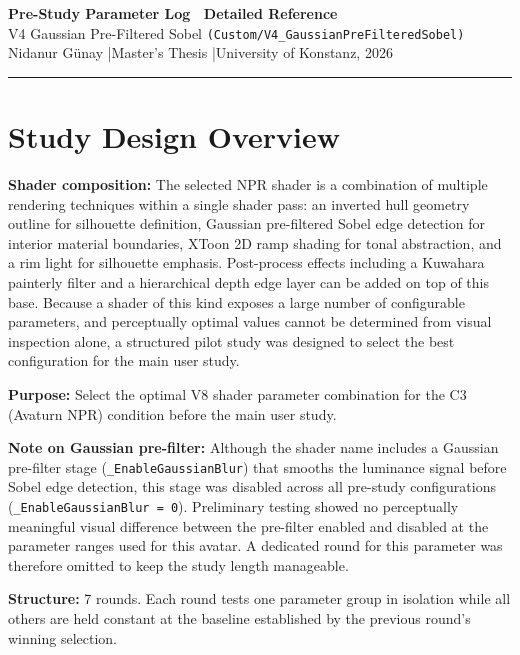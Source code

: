 \documentclass[11pt,a4paper]{article}
\newcommand{\prop}[1]{\texttt{#1}}
\begin{document}
\begin{center}
  {\Large\bfseries\color{uniblue} Pre-Study Parameter Log \textemdash\ Detailed Reference}\\[4pt]
  {\large V4 Gaussian Pre-Filtered Sobel \texttt{(Custom/V4\_GaussianPreFilteredSobel)}}\\[8pt]
  {\normalsize Nidanur G\"{u}nay \quad|\quad Master's Thesis \quad|\quad University of Konstanz, 2026}
\end{center}

\medskip
\noindent\rule{\linewidth}{0.4pt}
\medskip

\section*{Study Design Overview}

\textbf{Shader composition:} The selected NPR shader is a combination of multiple rendering techniques within a single shader pass: an inverted hull geometry outline for silhouette definition, Gaussian pre-filtered Sobel edge detection for interior material boundaries, XToon 2D ramp shading for tonal abstraction, and a rim light for silhouette emphasis. Post-process effects including a Kuwahara painterly filter and a hierarchical depth edge layer can be added on top of this base. Because a shader of this kind exposes a large number of configurable parameters, and perceptually optimal values cannot be determined from visual inspection alone, a structured pilot study was designed to select the best configuration for the main user study.

\medskip
\textbf{Purpose:} Select the optimal V8 shader parameter combination for the C3 (Avaturn NPR) condition before the main user study.

\textbf{Note on Gaussian pre-filter:} Although the shader name includes a Gaussian pre-filter stage (\prop{\_EnableGaussianBlur}) that smooths the luminance signal before Sobel edge detection, this stage was disabled across all pre-study configurations (\prop{\_EnableGaussianBlur = 0}). Preliminary testing showed no perceptually meaningful visual difference between the pre-filter enabled and disabled at the parameter ranges used for this avatar. A dedicated round for this parameter was therefore omitted to keep the study length manageable.

\medskip
\textbf{Structure:} 7 rounds. Each round tests one parameter group in isolation while all others are held constant at the baseline established by the previous round's winning selection.
\end{document}

